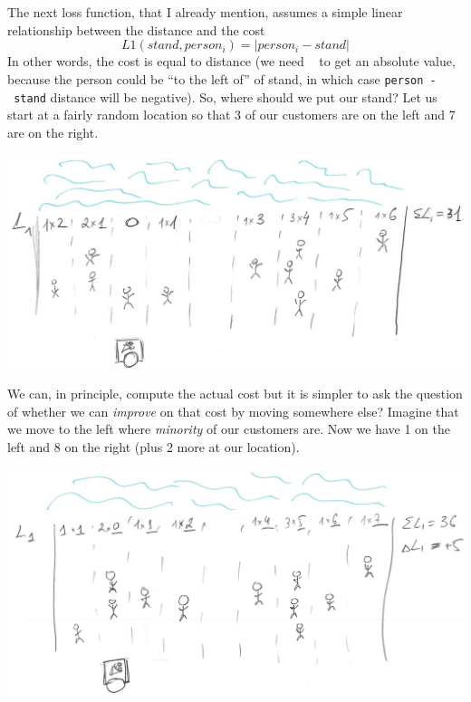 \documentclass[
]{book}
\begin{document}
The next loss function, that I already mention, assumes a simple linear relationship between the distance and the cost
\[L1(stand, person_i) = |person_i - stand|\]
In other words, the cost is equal to distance (we need \texttt{\textbar{}\ \textbar{}} to get an absolute value, because the person could be ``to the left of'' of stand, in which case \texttt{person\ -\ stand} distance will be negative). So, where should we put our stand? Let us start at a fairly random location so that 3 of our customers are on the left and 7 are on the right.

\begin{center}\includegraphics[width=1\linewidth]{images/loss-functions-L1-off-median} \end{center}

We can, in principle, compute the actual cost but it is simpler to ask the question of whether we can \emph{improve} on that cost by moving somewhere else? Imagine that we move to the left where \emph{minority} of our customers are. Now we have 1 on the left and 8 on the right (plus 2 more at our location).

\begin{center}\includegraphics[width=1\linewidth]{images/loss-functions-L1-left} \end{center}
\end{document}
